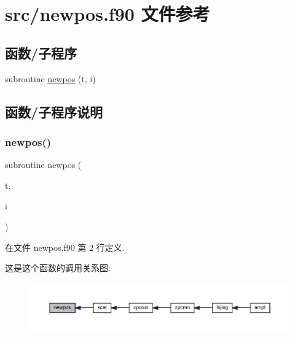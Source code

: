 \hypertarget{newpos_8f90}{}\section{src/newpos.f90 文件参考}
\label{newpos_8f90}
\subsection*{函数/子程序}
\begin{DoxyCompactItemize}
\item 
subroutine \mbox{\hyperlink{newpos_8f90_a87440f627870c25fda32dd78e833a7c5}{newpos}} (t, i)
\end{DoxyCompactItemize}


\subsection{函数/子程序说明}
\mbox{\label{newpos_8f90_a87440f627870c25fda32dd78e833a7c5}} 
\subsubsection{\texorpdfstring{newpos()}{newpos()}}
{\footnotesize\ttfamily subroutine newpos (\begin{DoxyParamCaption}\item[{}]{t,  }\item[{}]{i }\end{DoxyParamCaption})}



在文件 newpos.\+f90 第 2 行定义.

这是这个函数的调用关系图\+:
\nopagebreak
\begin{figure}[H]
\begin{center}
\leavevmode
\includegraphics[width=350pt]{newpos_8f90_a87440f627870c25fda32dd78e833a7c5_icgraph}
\end{center}
\end{figure}

